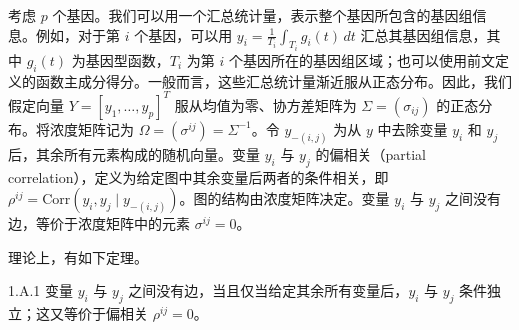考虑 $p$ 个基因。我们可以用一个汇总统计量，表示整个基因所包含的基因组信息。例如，对于第 $i$ 个基因，可以用 $y_i=\frac{1}{T_i}\int_{T_i}g_i(t)\,dt$ 汇总其基因组信息，其中 $g_i(t)$ 为基因型函数，$T_i$ 为第 $i$ 个基因所在的基因组区域；也可以使用前文定义的函数主成分得分。一般而言，这些汇总统计量渐近服从正态分布。因此，我们假定向量 $Y=[y_1,\ldots,y_p]^T$ 服从均值为零、协方差矩阵为 $\Sigma=(\sigma_{ij})$ 的正态分布。将浓度矩阵记为 $\Omega=(\sigma^{ij})=\Sigma^{-1}$。令 $y_{-(i,j)}$ 为从 $y$ 中去除变量 $y_i$ 和 $y_j$ 后，其余所有元素构成的随机向量。变量 $y_i$ 与 $y_j$ 的偏相关（partial correlation），定义为给定图中其余变量后两者的条件相关，即 $\rho^{ij}=\mathrm{Corr}(y_i,y_j\mid y_{-(i,j)})$。图的结构由浓度矩阵决定。变量 $y_i$ 与 $y_j$ 之间没有边，等价于浓度矩阵中的元素 $\sigma^{ij}=0$。

理论上，有如下定理。

\begin{booktheorem}{1.A.1}
变量 $y_i$ 与 $y_j$ 之间没有边，当且仅当给定其余所有变量后，$y_i$ 与 $y_j$ 条件独立；这又等价于偏相关 $\rho^{ij}=0$。
\end{booktheorem}

